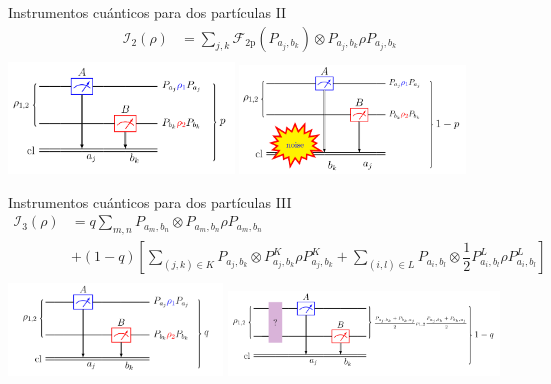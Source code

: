 \documentclass[svgnames,12pt,aspectratio=149]{beamer}
\begin{document}
\begin{frame}{Instrumentos cuánticos para dos partículas II}
  \begin{equation*}\label{eq:second-instrument-2p}
    \begin{split}
        \mathcal{I}_2(\rho)&=\sum_{j,k}\mathcal{F}_{2\text{p}}(P_{a_j,b_k})\otimes P_{a_j,b_k} \rho P_{a_j,b_k}\\
    \end{split}
\end{equation*} 
\includegraphics[width=60mm]{images/fmideaqi.png}\hfill
\includegraphics[width=60mm]{images/fmqi2.png}

\end{frame}

\begin{frame}{Instrumentos cuánticos para dos partículas III}
  \begin{equation*}\label{eq:quantum-instrument-3-desarrollo}
    \begin{split}
        \mathcal{I}_3(\rho)&=q\sum_{m,n}  P_{a_m,b_n}\otimes P_{a_m,b_n}\rho P_{a_m,b_n}\\
        &+(1-q)\left[\sum_{(j,k)\in K}P_{a_j,b_k} \otimes P^{K}_{a_j,b_k}\rho P^{K}_{a_j,b_k}+\sum_{(i,l) \in L}P_{a_i,b_l} \otimes  \dfrac{1}{2}P^{L}_{a_i,b_l}\rho P^L_{a_i,b_l}\right]\\
    \end{split}
\end{equation*}
\includegraphics[width=57mm]{images/fmidealiq3.png}\hfill 
\includegraphics[width=72mm]{images/fmqi3.png}
\end{frame}
\end{document}
